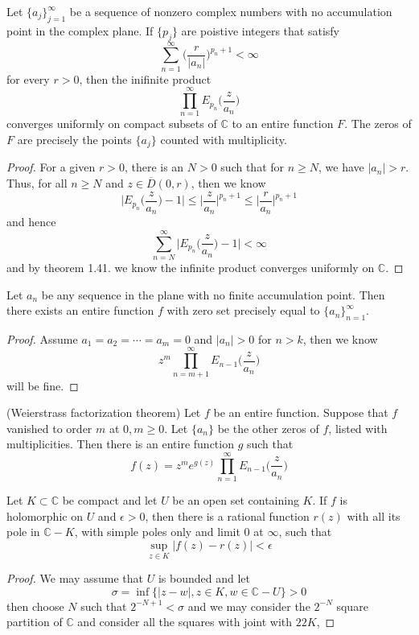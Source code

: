 \documentclass[lang=en, color=blue, ]{elegantbook}
\newcommand{\C}{\mathbb{C}}
\begin{document}
\begin{theorem}
    Let $\{a_j\}_{j=1}^{\infty}$ be a sequence of nonzero complex numbers with no accumulation point in the complex plane. If $\{p_j\}$ are poistive integers that satisfy
    \[\sum\limits_{n=1}^{\infty}\Big(\dfrac{r}{|a_n|}\Big)^{p_n+1} < \infty\]
    for every $r>0$, then the inifinite product
    \[\prod_{n=1}^{\infty}E_{p_n}\Big(\dfrac{z}{a_n}\Big)\]
    converges uniformly on compact subsets of $\C$ to an entire function $F$. The zeros of $F$ are precisely the points $\{a_j\}$ counted with multiplicity.
\end{theorem}
\begin{proof}
    For a given $r>0$, there is an $N>0$ such that for $n\geq N$, we have $|a_n| > r$. Thus, for all $n \geq N$ and $z\in \overline{D}(0,r)$, then we know
    \[
    \Big|E_{p_n}\Big(\dfrac{z}{a_n}\Big) - 1\Big| \leq \Big|\dfrac{z}{a_n}\Big|^{p_n+1} \leq \Big|\dfrac{r}{a_n}\Big|^{p_n+1}
    \]
    and hence
    \[
    \sum\limits_{n=N}^{\infty} \Big|E_{p_n}\Big(\dfrac{z}{a_n}\Big) - 1\Big| < \infty
    \]
    and by theorem 1.41. we know the infinite product converges uniformly on $\C$.
\end{proof}

\begin{corollary}
    Let $a_n$ be any sequence in the plane with no finite accumulation point. Then there exists an entire function $f$ with zero set precisely equal to $\{a_n\}_{n=1}^{\infty}$.
\end{corollary}
\begin{proof}
    Assume $a_1 = a_2 = \cdots = a_m = 0$ and $|a_{n}| > 0$ for $n > k$, then we know
    \[
    z^m \prod_{n = m+1}^{\infty}E_{n-1}\Big(\dfrac{z}{a_n}\Big)
    \]
    will be fine.
\end{proof}

\begin{theorem}
    (Weierstrass factorization theorem) Let $f$ be an entire function. Suppose that $f$ vanished to order $m$ at $0, m\geq 0$. Let $\{a_n\}$ be the other zeros of $f$, listed with multiplicities. Then there is an entire function $g$ such that
    \[
    f(z) = z^m e^{g(z)} \prod_{n=1}^{\infty}E_{n-1}\Big(\dfrac{z}{a_n}\Big)
    \]
\end{theorem}

\begin{proposition}
    Let $K\subset \C$ be compact and let $U$ be an open set containing $K$. If $f$ is holomorphic on $U$ and $\epsilon > 0$, then there is a rational function $r(z)$ with all its pole in $\C- K$, with simple poles only and limit $0$ at $\infty$, such that
    \[
    \sup_{z\in K}|f(z)-r(z)| < \epsilon
    \]
\end{proposition}
\begin{proof}
    We may assume that $U$ is bounded and let
    \[
    \sigma = \inf\{|z-w|, z\in K, w\in \C-U\} > 0
    \]
    then choose $N$ such that $2^{-N+1} < \sigma$ and we may consider the $2^{-N}$ square partition of $\C$ and consider all the squares with joint with $22K$,
\end{proof}
\end{document}
